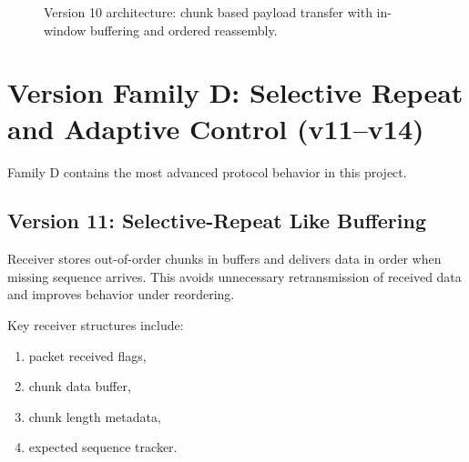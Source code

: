 \begin{figure}[h!]
{%
}
\caption{Version 10 architecture: chunk based payload transfer with in-window buffering and ordered reassembly.
}
\label{fig:v10-architecture}
\end{figure}

\clearpage
\section{Version Family D: Selective Repeat and Adaptive Control (v11--v14)}
Family D contains the most advanced protocol behavior in this project.

\subsection{Version 11: Selective-Repeat Like Buffering}
Receiver stores out-of-order chunks in buffers and delivers data in order when
missing sequence arrives. This avoids unnecessary retransmission of
received data and improves behavior under reordering.

Key receiver structures include:
\begin{enumerate}
    \item packet received flags,
    \item chunk data buffer,
    \item chunk length metadata,
    \item expected sequence tracker.
\end{enumerate}

